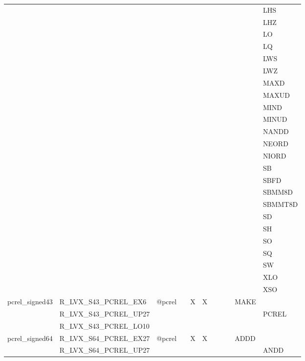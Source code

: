{\begin{tabular}{|l|l|l|l|l|l|l|l|l|l|l|}
 & & & & & & & & & & \textsf{LHS} \\
 & & & & & & & & & & \textsf{LHZ} \\
 & & & & & & & & & & \textsf{LO} \\
 & & & & & & & & & & \textsf{LQ} \\
 & & & & & & & & & & \textsf{LWS} \\
 & & & & & & & & & & \textsf{LWZ} \\
 & & & & & & & & & & \textsf{MAXD} \\
 & & & & & & & & & & \textsf{MAXUD} \\
 & & & & & & & & & & \textsf{MIND} \\
 & & & & & & & & & & \textsf{MINUD} \\
 & & & & & & & & & & \textsf{NANDD} \\
 & & & & & & & & & & \textsf{NEORD} \\
 & & & & & & & & & & \textsf{NIORD} \\
 & & & & & & & & & & \textsf{SB} \\
 & & & & & & & & & & \textsf{SBFD} \\
 & & & & & & & & & & \textsf{SBMM8D} \\
 & & & & & & & & & & \textsf{SBMMT8D} \\
 & & & & & & & & & & \textsf{SD} \\
 & & & & & & & & & & \textsf{SH} \\
 & & & & & & & & & & \textsf{SO} \\
 & & & & & & & & & & \textsf{SQ} \\
 & & & & & & & & & & \textsf{SW} \\
 & & & & & & & & & & \textsf{XLO} \\
 & & & & & & & & & & \textsf{XSO} \\
\hline
\textsf{pcrel\_signed43} & \textsf{R\_LVX\_S43\_PCREL\_EX6} & \textsf{@pcrel} & \textsf{} & \textsf{X} & \textsf{X} & \textsf{} & \textsf{} & \textsf{} & \textsf{MAKE} \\
 & \textsf{R\_LVX\_S43\_PCREL\_UP27} & & & & & & & & & \textsf{PCREL} \\
 & \textsf{R\_LVX\_S43\_PCREL\_LO10} & & & & & & & & & \\
\hline
\textsf{pcrel\_signed64} & \textsf{R\_LVX\_S64\_PCREL\_EX27} & \textsf{@pcrel} & \textsf{} & \textsf{X} & \textsf{X} & \textsf{} & \textsf{} & \textsf{} & \textsf{ADDD} \\
 & \textsf{R\_LVX\_S64\_PCREL\_UP27} & & & & & & & & & \textsf{ANDD} \\

\end{tabular}}
